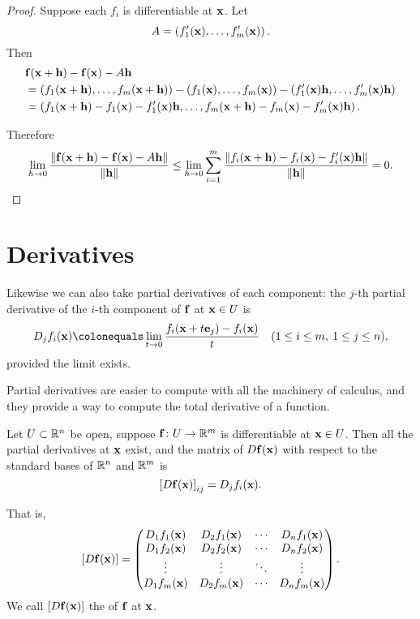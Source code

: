 \begin{proof}
Suppose each $f_i$ is differentiable at $\vb{x}$. Let
\[A=\left(f_1^\prime(\vb{x}),\dots,f_m^\prime(\vb{x})\right).\]
Then
\begin{align*}
&\vb{f}(\vb{x}+\vb{h})-\vb{f}(\vb{x})-A\vb{h}\\
&=\left(f_1(\vb{x}+\vb{h}),\dots,f_m(\vb{x}+\vb{h})\right)-\left(f_1(\vb{x}),\dots,f_m(\vb{x})\right)-\left(f_1^\prime(\vb{x})\vb{h},\dots,f_m^\prime(\vb{x})\vb{h}\right)\\
&=\left(f_1(\vb{x}+\vb{h})-f_1(\vb{x})-f_1^\prime(\vb{x})\vb{h},\dots,f_m(\vb{x}+\vb{h})-f_m(\vb{x})-f_m^\prime(\vb{x})\vb{h}\right).
\end{align*}

Therefore
\[\lim_{h\to0}\frac{\norm{\vb{f}(\vb{x}+\vb{h})-\vb{f}(\vb{x})-A\vb{h}}}{\norm{\vb{h}}}
\le\lim_{h\to0}\sum_{i=1}^{m}\frac{\norm{f_i(\vb{x}+\vb{h})-f_i(\vb{x})-f_i^\prime(\vb{x})\vb{h}}}{\norm{\vb{h}}}=0.\]
\end{proof}
\pagebreak

\section{Derivatives}
Likewise we can also take partial derivatives of each component: the $j$-th partial derivative of the $i$-th component of $\vb{f}$ at $\vb{x}\in U$ is
\[D_j f_i(\vb{x})\colonequals\lim_{t\to0}\frac{f_i(\vb{x}+t\vb{e}_j)-f_i(\vb{x})}{t}\quad(1\le i\le m,\:1\le j\le n),\]
provided the limit exists.

Partial derivatives are easier to compute with all the machinery of calculus, and they provide a way to compute the total derivative of a function.

\begin{theorem}
Let $U\subset\mathbb R^n$ be open, suppose $\vb{f}\colon U\to\mathbb R^m$ is differentiable at $\vb{x}\in U$. Then all the partial derivatives at $\vb{x}$ exist, and the matrix of $D\vb{f}(\vb{x})$ with respect to the standard bases of $\mathbb R^n$ and $\mathbb R^m$ is
\[\left[D\vb{f}(\vb{x})\right]_{ij}=D_j f_i(\vb{x}).\]
\end{theorem}

That is,
\[\left[D\vb{f}(\vb{x})\right]=\begin{pmatrix}
D_1f_1(\vb{x})&D_2f_1(\vb{x})&\cdots&D_nf_1(\vb{x})\\
D_1f_2(\vb{x})&D_2f_2(\vb{x})&\cdots&D_nf_2(\vb{x})\\
\vdots&\vdots&\ddots&\vdots\\
D_1f_m(\vb{x})&D_2f_m(\vb{x})&\cdots&D_nf_m(\vb{x})
\end{pmatrix}.\]
We call $\left[D\vb{f}(\vb{x})\right]$ the  of $\vb{f}$ at $\vb{x}$.

